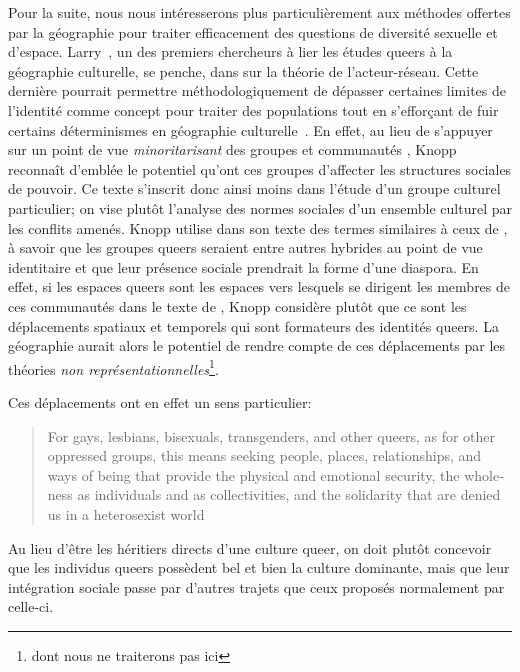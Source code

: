 Pour la suite, nous nous intéresserons plus particulièrement aux méthodes offertes par la géographie pour traiter efficacement des questions de diversité sexuelle et d'espace.
Larry~\citet{Knopp2004}, un des premiers chercheurs à lier les études queers à la géographie culturelle, se penche, dans  sur la théorie de l'acteur-réseau.
Cette dernière pourrait permettre méthodologiquement de dépasser certaines limites de l'identité comme concept pour traiter des populations \lgbt{} tout en s’efforçant de fuir certains déterminismes en géographie culturelle~\citep{Knopp2004}.
En effet, au lieu de s'appuyer sur un point de vue \emph{minoritarisant} des groupes et communautés \lgbt{}, Knopp reconnaît d'emblée le potentiel qu'ont ces groupes d'affecter les structures sociales de pouvoir.
Ce texte s'inscrit donc ainsi moins dans l'étude d'un groupe culturel particulier; on vise plutôt l'analyse des normes sociales d'un ensemble culturel par les conflits amenés.
Knopp utilise dans son texte des termes similaires à ceux de \citet{Sinfield1996}, à savoir que les groupes queers seraient entre autres hybrides au point de vue identitaire et que leur présence sociale prendrait la forme d'une diaspora.
En effet, si les espaces queers sont les espaces vers lesquels se dirigent les membres de ces communautés dans le texte de \citet{Sinfield1996}, Knopp considère plutôt que ce sont les déplacements spatiaux et temporels qui sont formateurs des identités queers.
La géographie aurait alors le potentiel de rendre compte de ces déplacements par les théories \emph{non représentationnelles}\footnote{dont nous ne traiterons pas ici}.

Ces déplacements ont en effet un sens particulier: \foreignblockquote{english}[{\cite[123]{Knopp2004}}][.]{For gays, lesbians, bisexuals, transgenders, and other queers, as for other oppressed groups, this means seeking people, places, relationships, and ways of being that provide the physical and emotional security, the wholeness as individuals and as collectivities, and the solidarity that are denied us in a heterosexist world}
Au lieu d'être les héritiers directs d'une culture queer{}, on doit plutôt concevoir que les individus queers{} possèdent bel et bien la culture dominante, mais que leur intégration sociale passe par d'autres trajets que ceux proposés normalement par celle-ci.

